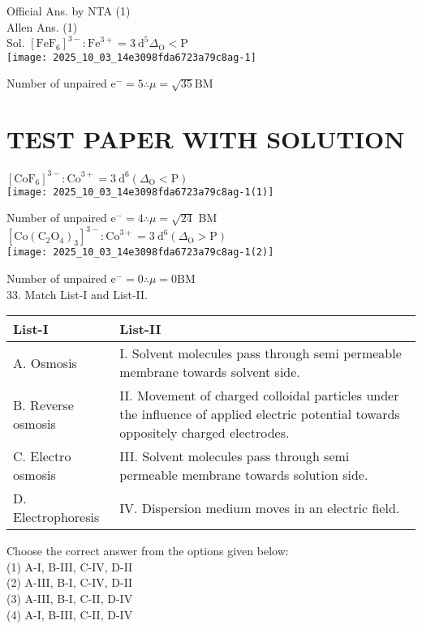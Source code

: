 \documentclass[10pt]{article}
\begin{document}
Official Ans. by NTA (1)\\
Allen Ans. (1)\\
Sol. \(\left[\mathrm{FeF}_{6}\right]^{3-}: \mathrm{Fe}^{3+}=3 \mathrm{~d}^{5} \Delta_{\mathrm{O}}<\mathrm{P}\)\\
\texttt{[image: 2025\_10\_03\_14e3098fda6723a79c8ag-1]}

Number of unpaired \(\mathrm{e}^{-}=5 \therefore \mu=\sqrt{35} \mathrm{BM}\)

\section*{TEST PAPER WITH SOLUTION}
\(\left[\mathrm{CoF}_{6}\right]^{3-}: \mathrm{Co}^{3+}=3 \mathrm{~d}^{6}\left(\Delta_{\mathrm{O}}<\mathrm{P}\right)\)\\
\texttt{[image: 2025\_10\_03\_14e3098fda6723a79c8ag-1(1)]}

Number of unpaired \(\mathrm{e}^{-}=4 \therefore \mu=\sqrt{24}\) BM\\
\(\left[\mathrm{Co}\left(\mathrm{C}_{2} \mathrm{O}_{4}\right)_{3}\right]^{3-}: \mathrm{Co}^{3+}=3 \mathrm{~d}^{6}\left(\Delta_{\mathrm{O}}>\mathrm{P}\right)\)\\
\texttt{[image: 2025\_10\_03\_14e3098fda6723a79c8ag-1(2)]}

Number of unpaired \(\mathrm{e}^{-}=0 \therefore \mu=0 \mathrm{BM}\)\\
33. Match List-I and List-II.

\begin{center}
\begin{tabular}{|l|l|}
\hline
List-I & List-II \\
\hline
A. Osmosis & I. Solvent molecules pass through semi permeable membrane towards solvent side. \\
\hline
B. Reverse osmosis & II. Movement of charged colloidal particles under the influence of applied electric potential towards oppositely charged electrodes. \\
\hline
C. Electro osmosis & III. Solvent molecules pass through semi permeable membrane towards solution side. \\
\hline
D. Electrophoresis & IV. Dispersion medium moves in an electric field. \\
\hline
\end{tabular}
\end{center}

Choose the correct answer from the options given below:\\
(1) A-I, B-III, C-IV, D-II\\
(2) A-III, B-I, C-IV, D-II\\
(3) A-III, B-I, C-II, D-IV\\
(4) A-I, B-III, C-II, D-IV
\end{document}
